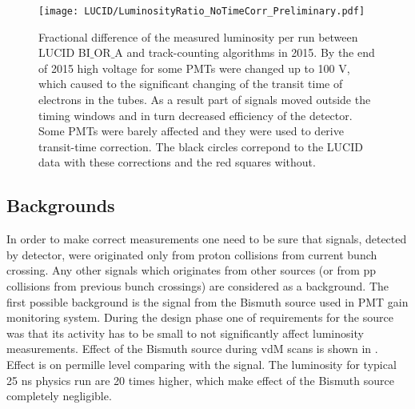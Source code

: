 \begin{figure}
\centering
\texttt{[image: LUCID/LuminosityRatio\_NoTimeCorr\_Preliminary.pdf]}
\caption{ 
Fractional difference of the measured luminosity per run between LUCID BI$\_$OR$\_$A and track-counting algorithms in 2015.
By the end of 2015 high voltage for some PMTs were changed up to 100 V, which caused to the significant changing of the transit time of electrons in the tubes.
As a result part of signals moved outside the timing windows and in turn decreased efficiency of the detector.
Some PMTs were barely affected and they were used to derive transit-time correction.
The black circles correpond to the LUCID data with these corrections and the red squares without.
}
\label{fig:transitTime}
\end{figure}

\subsection{Backgrounds}
\label{subsec:backgrounds}
In order to make correct measurements one need to be sure that signals, detected by detector, were originated only from proton collisions from current bunch crossing.
Any other signals which originates from other sources (or from pp collisions from previous bunch crossings) are considered as a background.
The first possible background is the signal from the Bismuth source used in PMT gain monitoring system.
During the design phase one of requirements for the source was that its activity has to be small to not significantly affect luminosity measurements.
Effect of the Bismuth source during vdM scans is shown in . Effect is on permille level comparing with the signal.
The luminosity for typical 25 ns physics run are 20 times higher, which make effect of the Bismuth source completely negligible. 

